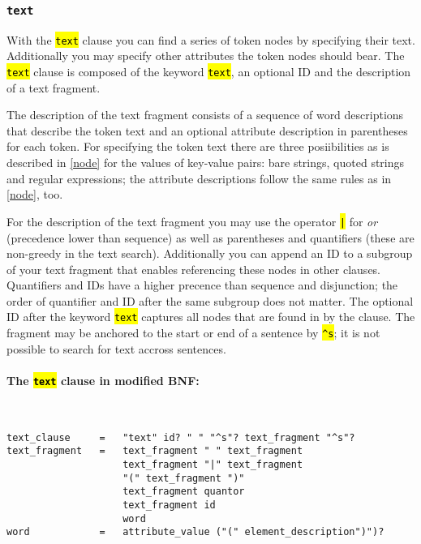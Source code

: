 \documentclass[12pt]{scrartcl}
\newcommand{\code}[1]{\hl{\texttt{#1}}}
\begin{document}
\subsubsection{\texttt{text}}

With the \code{text} clause you can find a series of token nodes by specifying their text.
Additionally you may specify other attributes the token nodes should bear.
The \code{text} clause is composed of the keyword \code{text}, an optional ID and the description of a text fragment.

The description of the text fragment consists of a sequence of word descriptions that describe the token text and an optional attribute description in parentheses for each token.
For specifying the token text there are three posiibilities as is described in \ref{node} for the values of key-value pairs: bare strings, quoted strings and regular expressions; the attribute descriptions follow the same rules as in \ref{node}, too.

For the description of the text fragment you may use the operator \code{|} for \textit{or} (precedence lower than sequence) as well as parentheses and quantifiers (these are non-greedy in the text search).
Additionally you can append an ID to a subgroup of your text fragment that enables referencing these nodes in other clauses.
Quantifiers and IDs have a higher precence than sequence and disjunction; the order of quantifier and ID after the same subgroup does not matter.
The optional ID after the keyword \code{text} captures all nodes that are found in by the clause.
The fragment may be anchored to the start or end of a sentence by \code{\textasciicircum s}; it is not possible to search for text accross sentences.

\paragraph*{The \code{text} clause in modified BNF:}
~
\begin{lstlisting}
text_clause     =   "text" id? " " "^s"? text_fragment "^s"?
text_fragment   =   text_fragment " " text_fragment
                    text_fragment "|" text_fragment
                    "(" text_fragment ")"
                    text_fragment quantor
                    text_fragment id
                    word
word            =   attribute_value ("(" element_description")")?
\end{lstlisting}
\end{document}
